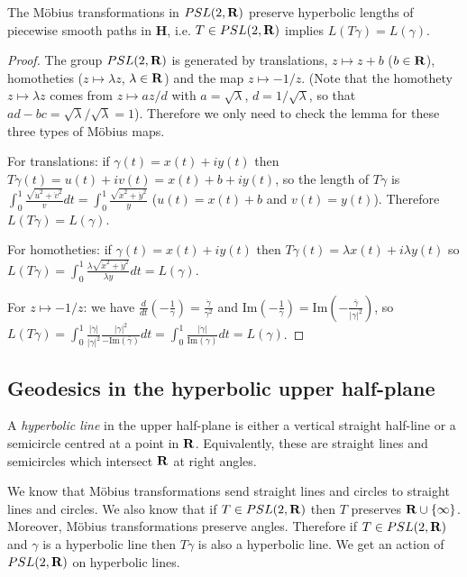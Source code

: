 \documentclass[12pt]{article}
\begin{document}
\begin{lma}
  The M\"obius transformations in $PSL(2,\mathbf{R})$ preserve hyperbolic lengths of piecewise smooth paths in $\mathbf{H}$, i.e. $T\in PSL(2,\mathbf{R})$ implies $L(T\gamma)=L(\gamma)$.
\end{lma}
\begin{proof}
  The group $PSL(2,\mathbf{R})$ is generated by translations, $z\mapsto z+b$ ($b\in\mathbf{R}$), homotheties ($z\mapsto \lambda z$, $\lambda\in\mathbf{R}$) and the map $z\mapsto -1/z$. (Note that the homothety $z\mapsto \lambda z$ comes from $z\mapsto az/d$ with $a=\sqrt{\lambda}$, $d=1/\sqrt{\lambda}$, so that $ad-bc=\sqrt{\lambda}/\sqrt{\lambda}=1$). Therefore we only need to check the lemma for these three types of M\"obius maps.

  For translations: if $\gamma(t)=x(t)+iy(t)$ then $T\gamma(t)=u(t)+iv(t)=x(t)+b+iy(t)$, so the length of $T\gamma$ is $\int_0^1\frac{\sqrt{\dot{u}^2+\dot{v}^2}}{v}dt=\int_0^1\frac{\sqrt{\dot{x}^2+\dot{y}^2}}{y}$ ($u(t)=x(t)+b$ and $v(t)=y(t)$). Therefore $L(T\gamma)=L(\gamma)$.

  For homotheties: if $\gamma(t)=x(t)+iy(t)$ then $T\gamma(t)=\lambda x(t)+i\lambda y(t)$ so $L(T\gamma)=\int_0^1\frac{\lambda\sqrt{\dot{x}^2+\dot{y}^2}}{\lambda y}dt=L(\gamma)$.

  For $z\mapsto -1/z$: we have $\frac{d}{dt}\left(-\frac{1}{\gamma}\right)=\frac{\dot{\gamma}}{\gamma^2}$ and $\mathrm{Im}\left(-\frac{1}{\gamma}\right)=\mathrm{Im}\left(-\frac{\bar{\gamma}}{|\gamma|^2}\right)$, so $L(T\gamma)=\int_0^1\frac{|\dot{\gamma}|}{|\gamma|^2}\frac{|\gamma|^2}{-\mathrm{Im}(\bar{\gamma})}dt=\int_0^1\frac{|\dot{\gamma}|}{\mathrm{Im}(\gamma)}dt=L(\gamma)$.
\end{proof}

\subsection{Geodesics in the hyperbolic upper half-plane}

\begin{dfn}
  A {\em hyperbolic line} in the upper half-plane is either a vertical straight half-line or a semicircle centred at a point in $\mathbf{R}$. Equivalently, these are straight lines and semicircles which intersect $\mathbf{R}$ at right angles.
\end{dfn}

We know that M\"obius transformations send straight lines and circles to straight lines and circles. We also know that if $T\in PSL(2,\mathbf{R})$ then $T$ preserves $\mathbf{R}\cup\{\infty\}$. Moreover, M\"obius transformations preserve angles. Therefore if $T\in PSL(2,\mathbf{R})$ and $\gamma$ is a hyperbolic line then $T\gamma$ is also a hyperbolic line. We get an action of $PSL(2,\mathbf{R})$ on hyperbolic lines.
\end{document}
